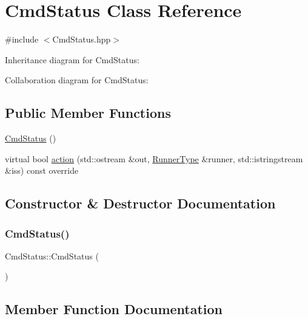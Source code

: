 \hypertarget{classCmdStatus}{}\section{Cmd\+Status Class Reference}
\label{classCmdStatus}


{\ttfamily \#include $<$Cmd\+Status.\+hpp$>$}



Inheritance diagram for Cmd\+Status\+:


Collaboration diagram for Cmd\+Status\+:
\subsection*{Public Member Functions}
\begin{DoxyCompactItemize}
\item 
\hyperlink{classCmdStatus_ab7765ce2246b3a90c7d394e2bb6e92cc}{Cmd\+Status} ()
\item 
virtual bool \hyperlink{classCmdStatus_addfd30518dd62c345c2abc555fee78d0}{action} (std\+::ostream \&out, \hyperlink{Command_8hpp_a3594ceaf3c835811a9a67810e7af19f9}{Runner\+Type} \&runner, std\+::istringstream \&iss) const override
\end{DoxyCompactItemize}


\subsection{Constructor \& Destructor Documentation}
\mbox{\label{classCmdStatus_ab7765ce2246b3a90c7d394e2bb6e92cc}} 
\subsubsection{\texorpdfstring{Cmd\+Status()}{CmdStatus()}}
{\footnotesize\ttfamily Cmd\+Status\+::\+Cmd\+Status (\begin{DoxyParamCaption}{ }\end{DoxyParamCaption})}



\subsection{Member Function Documentation}
\mbox{\label{classCmdStatus_addfd30518dd62c345c2abc555fee78d0}} 
